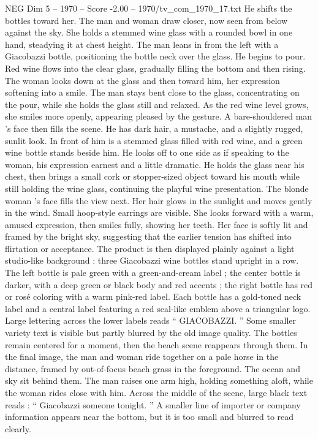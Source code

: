 \begin{textsample}{NEG Dim 5 – 1970 – Score -2.00 – 1970/tv\_com\_1970\_17.txt}
He shifts the bottles toward her.
The man and woman draw closer, now seen from below against the sky.
She holds a stemmed wine glass with a rounded bowl in one hand, steadying it at chest height.
The man leans in from the left with a Giacobazzi bottle, positioning the bottle neck over the glass.
He begins to pour.
Red wine flows into the clear glass, gradually filling the bottom and then rising.
The woman looks down at the glass and then toward him, her expression softening into a smile.
The man stays bent close to the glass, concentrating on the pour, while she holds the glass still and relaxed.
As the red wine level grows, she smiles more openly, appearing pleased by the gesture.
A bare-shouldered man ’s face then fills the scene.
He has dark hair, a mustache, and a slightly rugged, sunlit look.
In front of him is a stemmed glass filled with red wine, and a green wine bottle stands beside him.
He looks off to one side as if speaking to the woman, his expression earnest and a little dramatic.
He holds the glass near his chest, then brings a small cork or stopper-sized object toward his mouth while still holding the wine glass, continuing the playful wine presentation.
The blonde woman ’s face fills the view next.
Her hair glows in the sunlight and moves gently in the wind.
Small hoop-style earrings are visible.
She looks forward with a warm, amused expression, then smiles fully, showing her teeth.
Her face is softly lit and framed by the bright sky, suggesting that the earlier tension has shifted into flirtation or acceptance.
The product is then displayed plainly against a light studio-like background : three Giacobazzi wine bottles stand upright in a row.
The left bottle is pale green with a green-and-cream label ; the center bottle is darker, with a deep green or black body and red accents ; the right bottle has red or rosé coloring with a warm pink-red label.
Each bottle has a gold-toned neck label and a central label featuring a red seal-like emblem above a triangular logo.
Large lettering across the lower labels reads “ GIACOBAZZI. ” Some smaller variety text is visible but partly blurred by the old image quality.
The bottles remain centered for a moment, then the beach scene reappears through them.
In the final image, the man and woman ride together on a pale horse in the distance, framed by out-of-focus beach grass in the foreground.
The ocean and sky sit behind them.
The man raises one arm high, holding something aloft, while the woman rides close with him.
Across the middle of the scene, large black text reads : “ Giacobazzi someone tonight. ” A smaller line of importer or company information appears near the bottom, but it is too small and blurred to read clearly.

\end{textsample}
